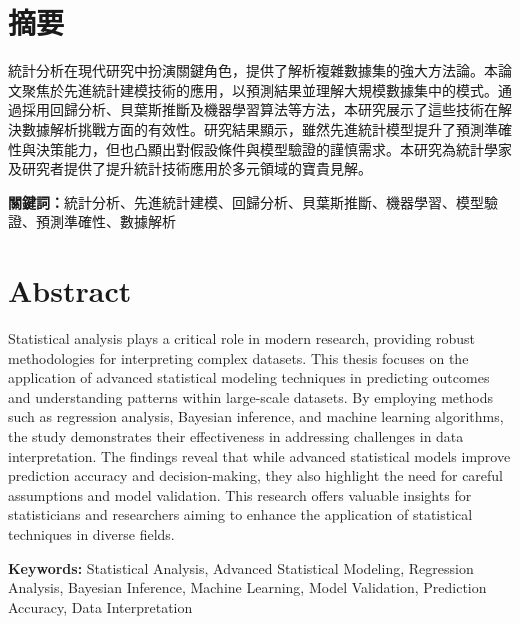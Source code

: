 \chapter*{\hfill 摘要\hfill}
統計分析在現代研究中扮演關鍵角色，提供了解析複雜數據集的強大方法論。本論文聚焦於先進統計建模技術的應用，以預測結果並理解大規模數據集中的模式。通過採用回歸分析、貝葉斯推斷及機器學習算法等方法，本研究展示了這些技術在解決數據解析挑戰方面的有效性。研究結果顯示，雖然先進統計模型提升了預測準確性與決策能力，但也凸顯出對假設條件與模型驗證的謹慎需求。本研究為統計學家及研究者提供了提升統計技術應用於多元領域的寶貴見解。

\vspace*{12pt}

\noindent\textbf{關鍵詞：}統計分析、先進統計建模、回歸分析、貝葉斯推斷、機器學習、模型驗證、預測準確性、數據解析 
\clearpage

\chapter*{\hfill Abstract\hfill}
Statistical analysis plays a critical role in modern research, providing robust methodologies for interpreting complex datasets. This thesis focuses on the application of advanced statistical modeling techniques in predicting outcomes and understanding patterns within large-scale datasets. By employing methods such as regression analysis, Bayesian inference, and machine learning algorithms, the study demonstrates their effectiveness in addressing challenges in data interpretation. The findings reveal that while advanced statistical models improve prediction accuracy and decision-making, they also highlight the need for careful assumptions and model validation. This research offers valuable insights for statisticians and researchers aiming to enhance the application of statistical techniques in diverse fields.

\vspace*{12pt}

\noindent\textbf{Keywords: }Statistical Analysis, Advanced Statistical Modeling, Regression Analysis, Bayesian Inference, Machine Learning, Model Validation, Prediction Accuracy, Data Interpretation
\clearpage
